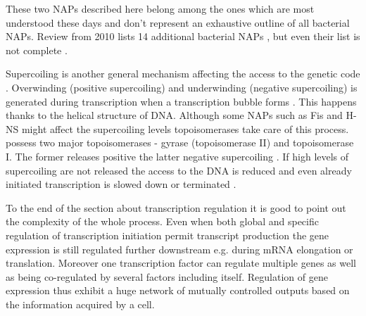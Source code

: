 These two NAPs described here belong among the ones which are most understood these days and don't represent an exhaustive outline of all bacterial NAPs.
Review from 2010 lists 14 additional bacterial NAPs \cite{dillon2010bacterial}, but even their list is not complete \cite{aznar2013hha}.

Supercoiling is another general mechanism affecting the access to the genetic code \cite{brahms1985activation}.
Overwinding (positive supercoiling) and underwinding (negative supercoiling) is generated during transcription when a transcription bubble forms \cite{wu1988transcription}.
This happens thanks to the helical structure of DNA.
Although some NAPs such as Fis and H-NS might affect the supercoiling levels \cite{ouafa2012nucleoid} topoisomerases take care of this process.
 possess two major topoisomerases - gyrase (topoisomerase II) and topoisomerase I.
The former releases positive the latter negative supercoiling \cite{wang1971interaction, gellert1976dna}.
If high levels of supercoiling are not released the access to the DNA is reduced and even already initiated transcription is slowed down or terminated \cite{chong2014mechanism}.

To the end of the section about transcription regulation it is good to point out the complexity of the whole process.
Even when both global and specific regulation of transcription initiation permit transcript production the gene expression is still regulated further downstream e.g. during mRNA elongation or translation.
Moreover one transcription factor can regulate multiple genes as well as being co-regulated by several factors including itself.
Regulation of gene expression thus exhibit a huge network of mutually controlled outputs based on the information acquired by a cell.



